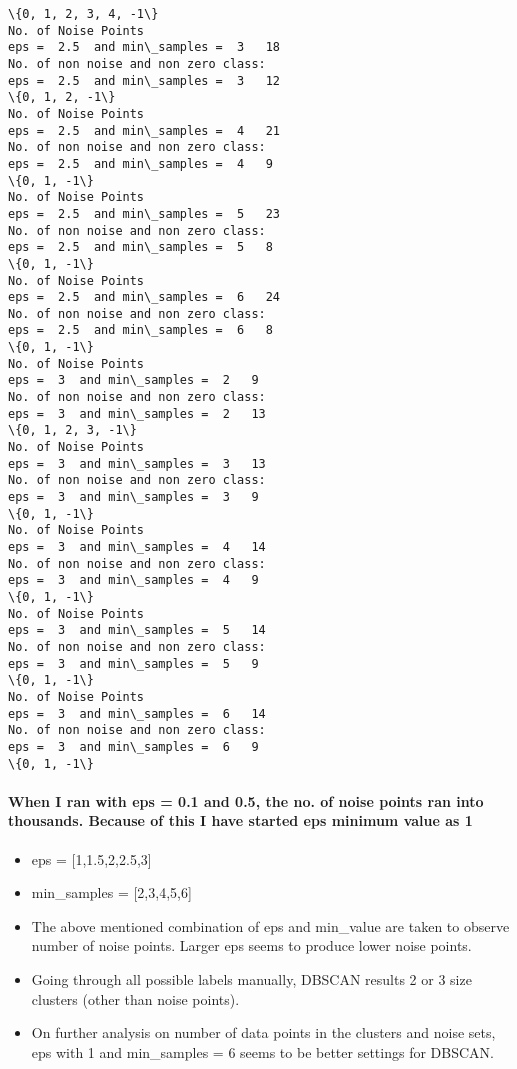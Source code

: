 \documentclass[11pt]{article}
\begin{document}
\begin{Verbatim}[commandchars=\\\{\}]
\{0, 1, 2, 3, 4, -1\}
No. of Noise Points
eps =  2.5  and min\_samples =  3   18
No. of non noise and non zero class:
eps =  2.5  and min\_samples =  3   12
\{0, 1, 2, -1\}
No. of Noise Points
eps =  2.5  and min\_samples =  4   21
No. of non noise and non zero class:
eps =  2.5  and min\_samples =  4   9
\{0, 1, -1\}
No. of Noise Points
eps =  2.5  and min\_samples =  5   23
No. of non noise and non zero class:
eps =  2.5  and min\_samples =  5   8
\{0, 1, -1\}
No. of Noise Points
eps =  2.5  and min\_samples =  6   24
No. of non noise and non zero class:
eps =  2.5  and min\_samples =  6   8
\{0, 1, -1\}
No. of Noise Points
eps =  3  and min\_samples =  2   9
No. of non noise and non zero class:
eps =  3  and min\_samples =  2   13
\{0, 1, 2, 3, -1\}
No. of Noise Points
eps =  3  and min\_samples =  3   13
No. of non noise and non zero class:
eps =  3  and min\_samples =  3   9
\{0, 1, -1\}
No. of Noise Points
eps =  3  and min\_samples =  4   14
No. of non noise and non zero class:
eps =  3  and min\_samples =  4   9
\{0, 1, -1\}
No. of Noise Points
eps =  3  and min\_samples =  5   14
No. of non noise and non zero class:
eps =  3  and min\_samples =  5   9
\{0, 1, -1\}
No. of Noise Points
eps =  3  and min\_samples =  6   14
No. of non noise and non zero class:
eps =  3  and min\_samples =  6   9
\{0, 1, -1\}

    \end{Verbatim}

    \paragraph{When I ran with eps = 0.1 and 0.5, the no. of noise points
ran into thousands. Because of this I have started eps minimum value as
1}\label{when-i-ran-with-eps-0.1-and-0.5-the-no.-of-noise-points-ran-into-thousands.-because-of-this-i-have-started-eps-minimum-value-as-1}

    \begin{itemize}
\item
  eps = {[}1,1.5,2,2.5,3{]}
\item
  min\_samples = {[}2,3,4,5,6{]}
\item
  The above mentioned combination of eps and min\_value are taken to
  observe number of noise points. Larger eps seems to produce lower
  noise points.
\item
  Going through all possible labels manually, DBSCAN results 2 or 3 size
  clusters (other than noise points).
\item
  On further analysis on number of data points in the clusters and noise
  sets, eps with 1 and min\_samples = 6 seems to be better settings for
  DBSCAN.
\end{itemize}
\end{document}
